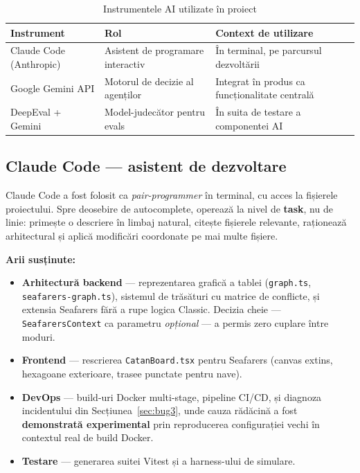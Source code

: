 \documentclass[11pt,a4paper]{article}
\begin{document}
\begin{table}[H]
\centering
\begin{tabularx}{\textwidth}{@{}l X X@{}}
\toprule
\textbf{Instrument} & \textbf{Rol} & \textbf{Context de utilizare} \\
\midrule
Claude Code (Anthropic) & Asistent de programare interactiv & În terminal, pe parcursul dezvoltării \\
Google Gemini API & Motorul de decizie al agenților & Integrat în produs ca funcționalitate centrală \\
DeepEval + Gemini & Model-judecător pentru evals & În suita de testare a componentei AI \\
\bottomrule
\end{tabularx}
\caption{Instrumentele AI utilizate în proiect}
\end{table}

\subsection{Claude Code --- asistent de dezvoltare}

Claude Code a fost folosit ca \textit{pair-programmer} în terminal, cu acces la
fișierele proiectului. Spre deosebire de autocomplete, operează la nivel de
\textbf{task}, nu de linie: primește o descriere în limbaj natural, citește
fișierele relevante, raționează arhitectural și aplică modificări coordonate pe
mai multe fișiere.

\textbf{Arii susținute:}
\begin{itemize}
  \item \textbf{Arhitectură backend} --- reprezentarea grafică a tablei
        (\texttt{graph.ts}, \texttt{seafarers-graph.ts}), sistemul de trăsături cu
        matrice de conflicte, și extensia Seafarers fără a rupe logica Classic.
        Decizia cheie --- \texttt{SeafarersContext} ca parametru \textit{opțional} ---
        a permis zero cuplare între moduri.
  \item \textbf{Frontend} --- rescrierea \texttt{CatanBoard.tsx} pentru Seafarers
        (canvas extins, hexagoane exterioare, trasee punctate pentru nave).
  \item \textbf{DevOps} --- build-uri Docker multi-stage, pipeline CI/CD, și
        diagnoza incidentului din Secțiunea~\ref{sec:bug3}, unde cauza rădăcină a
        fost \textbf{demonstrată experimental} prin reproducerea configurației
        vechi în contextul real de build Docker.
  \item \textbf{Testare} --- generarea suitei Vitest și a harness-ului de simulare.
\end{itemize}
\end{document}

